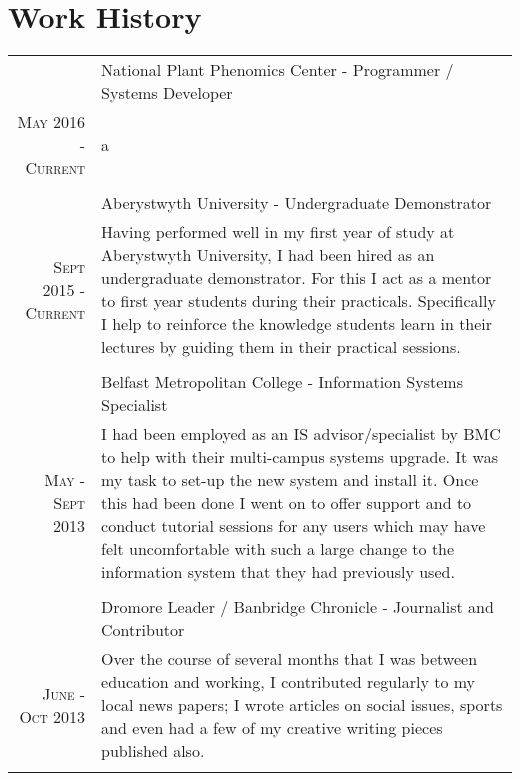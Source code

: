 \documentclass[a4paper,10pt]{article}
\begin{document}
\section{Work History}
\begin{longtable}{r|p{11cm}}
  
  &National Plant Phenomics Center - Programmer / Systems Developer \\\textsc{May 2016 - Current}&\footnotesize{
                                                                                                   a
                                                                                                   }\\\multicolumn{2}{c}{} \\
  
  
  &Aberystwyth University - Undergraduate Demonstrator \\\textsc{Sept 2015 - Current}&\footnotesize{Having performed well in my first year of study at Aberystwyth University, I had been hired as an undergraduate demonstrator. For this I act as a mentor to first year students during their practicals. Specifically I help to reinforce the knowledge students learn in their lectures by guiding them in their practical sessions.}\\\multicolumn{2}{c}{} \\

  &Belfast Metropolitan College - Information Systems Specialist \\\textsc{May - Sept 2013}&\footnotesize{I had been employed as an IS advisor/specialist by BMC to help with their multi-campus systems upgrade. It was my task to set-up the new system and install it. Once this had been done I went on to offer support and to conduct tutorial sessions for any users which may have felt uncomfortable with such a large change to the information system that they had previously used.}\\\multicolumn{2}{c}{} \\
  &Dromore Leader / Banbridge Chronicle - Journalist and Contributor \\\textsc{June - Oct 2013}&\footnotesize{Over the course of several months that I was between education and working, I contributed regularly to my local news papers; I wrote articles on social issues, sports and even had a few of my creative writing pieces published also.}\\\multicolumn{2}{c}{} \\


\end{longtable}
\end{document}
